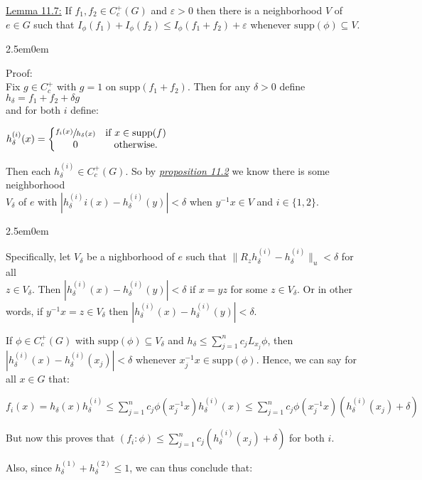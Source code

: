 \documentclass{book}
\newcommand{\inLinkRap}[2]{{\color{blue}\hyperlink{#1}{\textit{#2}}}}
\newcommand{\exTwo}{%
   \color{Purple}%
   \fontsize{13}{15}\selectfont%
}
\newcommand{\exThreeP}{%
   \color{RedViolet}%
   \fontsize{12}{14}\selectfont%
}
\newcommand{\exPPP}{%
   \color{VioletRed}%
   \fontsize{12}{14}\selectfont%
}
\newenvironment{myIndent}{%
   \begin{adjustwidth}{2.5em}{0em}%
}{%
   \end{adjustwidth}%
}
\newcommand{\supp}{\mathrm{supp}}
\newcommand{\retTwo}{\hfill\bigbreak}
\begin{document}
\exTwo\ul{Lemma 11.7:} If $f_1, f_2 \in C_c^+(G)$ and $\varepsilon > 0$ then there is a neighborhood $V$ of $e \in G$ such that $I_\phi(f_1) + I_\phi(f_2) \leq I_\phi(f_1 + f_2) + \varepsilon$ whenever $\supp(\phi) \subseteq V$. 
\begin{myIndent}\exThreeP
	Proof:\\
	Fix $g \in C_c^+$ with $g = 1$ on $\supp(f_1 + f_2)$. Then for any $\delta > 0$ define $h_\delta = f_1 + f_2 + \delta g$\\ [-1pt] and for both $i$ define:
	
	{\centering$h^{(i)}_\delta(x) = \left\{\begin{matrix}
		\sfrac{f_i(x)}{h_\delta(x)} & \text{if } x \in \supp(f) \\
		0 & \text{otherwise.}
	\end{matrix}\right.$\retTwo\par}

	Then each $h^{(i)}_\delta \in C_c^+(G)$. So by \inLinkRap{Folland Proposition 11.2}{proposition 11.2} we know there is some neighborhood\\ $V_\delta$ of $e$ with $|h_\delta^{(i)}i(x) - h_\delta^{(i)}(y)| < \delta$ when $y^{-1}x \in V$ and $i \in \{1, 2\}$.
	\begin{myIndent}\exPPP
		Specifically, let $V_\delta$ be a nighborhood of $e$ such that $\|R_z h_\delta^{(i)} - h_\delta^{(i)}\|_u < \delta$ for all\\ $z \in V_\delta$. Then $|h_\delta^{(i)}(x) - h_\delta^{(i)}(y)| < \delta$ if $x = yz$ for some $z \in V_\delta$. Or in other\\ words, if $y^{-1}x = z \in V_\delta$ then $|h_\delta^{(i)}(x) - h_\delta^{(i)}(y)| < \delta$.\retTwo
	\end{myIndent}

	If $\phi \in C_c^+(G)$ with $\supp(\phi) \subseteq V_\delta$ and $h_\delta \leq \sum_{j=1}^n c_j L_{x_j}\phi$, then $|h_\delta^{(i)}(x) - h_\delta^{(i)}(x_j)| < \delta$ whenever $x_j^{-1} x \in \supp(\phi)$. Hence, we can say for all $x \in G$ that:

	{\centering $f_i(x) = h_\delta(x)h_\delta^{(i)} \leq \sum\limits_{j=1}^n c_j \phi(x_j^{-1} x)h_\delta^{(i)}(x) \leq \sum\limits_{j=1}^n c_j \phi(x_j^{-1} x)(h_\delta^{(i)}(x_j) + \delta)$ \newpage\par}

	But now this proves that $(f_i : \phi) \leq \sum_{j=1}^n c_j(h_\delta^{(i)}(x_j) + \delta)$ for both $i$.\retTwo
	
	Also, since $h_\delta^{(1)} + h_\delta^{(2)} \leq 1$, we can thus conclude that:
	

\end{myIndent}
\end{document}
